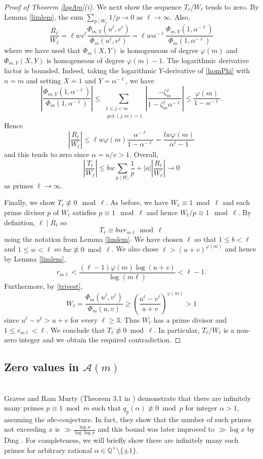 \documentclass[10pt,a4paper]{amsart}
\newcommand{\cA}{\mathcal A}
\begin{document}
\begin{proof}[Proof of Theorem \ref{logAm}(i)]
We next show the sequence $T_\ell/W_\ell$ tends to zero. By Lemma \ref{limlem}, the sum $\sum_{p\mid W_\ell}1/p\to 0$ as $\ell\to\infty$. Also,
\[\frac{R_\ell}{W_\ell}=\ell wv^\ell\frac{\Phi_{m,Y}(u^\ell,v^\ell)}{\Phi_m(u^\ell,v^\ell)}
=\ell w\alpha^{-\ell}\frac{\Phi_{m,Y}(1,\alpha^{-\ell})}{\Phi_m(1,\alpha^{-\ell})}
\]
where we have used that $\Phi_m(X,Y)$ is homogeneous of degree $\varphi(m)$ and $\Phi_{m,Y}(X,Y)$ is homogeneous of degree $\varphi(m)-1$. The logarithmic derivative factor is bounded. Indeed, taking the logarithmic $Y$-derivative of \eqref{homPhi} with $n=m$ and setting $X=1$ and $Y=\alpha^{-\ell}$, we have 
\[\left|\frac{\Phi_{m,Y}(1,\alpha^{-\ell})}{\Phi_m(1,\alpha^{-\ell})}\right|\leq
\sum_{\substack{1\leq j<m \\ \gcd(j,m)=1}}\left|\frac{-\zeta_m^j}{1-\zeta_m^j\alpha^{-\ell}}\right|
\leq\frac{\varphi(m)}{1-\alpha^{-\ell}}.\]
Hence 
\[\left|\frac{R_\ell}{W_\ell}\right|\leq\ell w\varphi(m)\frac{\alpha^{-\ell}}{1-\alpha^{-\ell}}=\frac{lw\varphi(m)}{\alpha^\ell-1}\]
and this tends to zero since $\alpha=u/v>1$. Overall, 
\[\left|\frac{T_\ell}{W_\ell}\right|\leq bw\sum_{p\mid W_\ell}\frac{1}{p}+|a|\left|\frac{R_\ell}{W_\ell}\right|\longrightarrow 0
\]
as primes $\ell\to\infty$.
\medskip

Finally, we show $T_\ell\not\equiv 0\mod \ell$. 
As before, we have $W_\ell\equiv 1\bmod \ell$ and each prime divisor $p$ of $W_\ell$ satisfies $p\equiv 1\mod \ell$ and hence $W_\ell/p\equiv 1\mod\ell$. By definition, $\ell\mid R_\ell$ so
\[T_\ell\equiv bwr_{m\ell}\bmod \ell\]
using the notation from Lemma \ref{limlem}. We have chosen $\ell$ so that $1\leq b<\ell$ and $1\leq w<\ell$ so $bw\not\equiv 0\bmod\ell$. We also chose $\ell>(u+v)^{\varphi(m)}$ and hence by Lemma \ref{limlem}, 
\[r_{m\ell}<\frac{(\ell-1)\varphi(m)\log(u+v)}{\log(m\ell)}<\ell-1.\]
Furthermore, by \eqref{trivest}, 
\[W_\ell=\frac{\Phi_m(u^\ell,v^\ell)}{\Phi_m(u,v)}\geq\left(\frac{u^\ell-v^\ell}{u+v}\right)^{\varphi(m)}>1
\]
since $u^\ell-v^\ell>u+v$ for every $\ell\geq 3$. Thus $W_\ell$ has a prime divisor and $1\leq r_{m\ell}<\ell$. 
We conclude that $T_\ell\not\equiv 0\bmod \ell$. In particular, $T_\ell/W_\ell$ is a non-zero integer and we obtain the required contradiction.
\end{proof}


\subsection{Zero values in $\cA(m)$} $\,$\\[3pt]
Graves and Ram Murty (Theorem 3.1 in \cite{GRM13}) demonstrate that there are infinitely many primes $p\equiv 1\bmod m$ such that $q_p(\alpha)\not\equiv 0\bmod p$ for integer $\alpha>1$, assuming the $abc$-conjecture. In fact, they show that the number of such primes not exceeding $x$ is $\gg \frac{\log x}{\log\log x}$ and this bound was later improved to $\gg\log x$ by Ding \cite{D19}. For completeness, we will briefly show there are infinitely many such primes for arbitrary rational $\alpha\in\mathbb{Q}^\times\setminus\{\pm 1\}$. 
\end{document}
